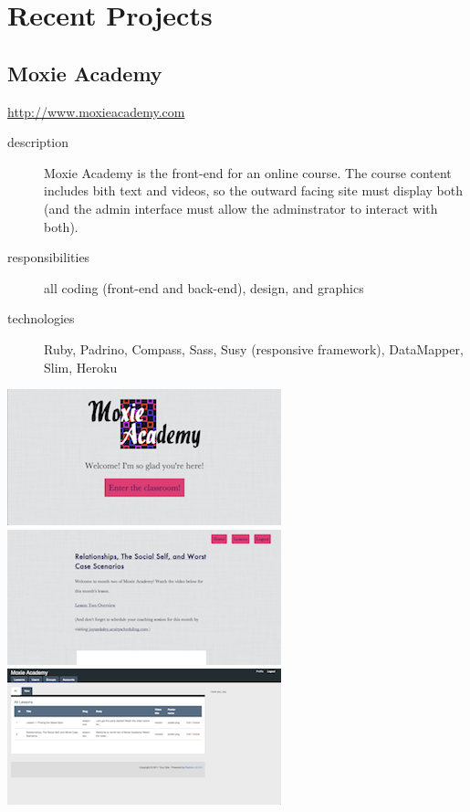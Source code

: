 \documentclass{article}
\begin{document}
\hline
\section{Recent Projects} %
\label{sec:Recent Projects}

\subsection{Moxie Academy} %
\label{sub:Moxie Academy}

\begin{multicols}{2}
\href{http://www.moxieacademy.com}{http://www.moxieacademy.com}

\begin{description}
  \item[description] Moxie Academy is the front-end for an online 
    course.  The course content includes bith text and videos, so the 
    outward facing site must display both (and the admin interface 
    must allow the adminstrator to interact with both).
  \item[responsibilities] all coding (front-end and back-end), design, and graphics
  \item[technologies] Ruby, Padrino, Compass, Sass, Susy (responsive framework), DataMapper, Slim, Heroku
\end{description}

\includegraphics[scale=.5]{../source/images/portfolio/moxie-homepage-sm.png}\\
\includegraphics[scale=.5]{../source/images/portfolio/moxie-lesson-sm.png}\\
\includegraphics[scale=.5]{../source/images/portfolio/moxie-admin-sm.png}\\

\end{multicols}
\end{document}
